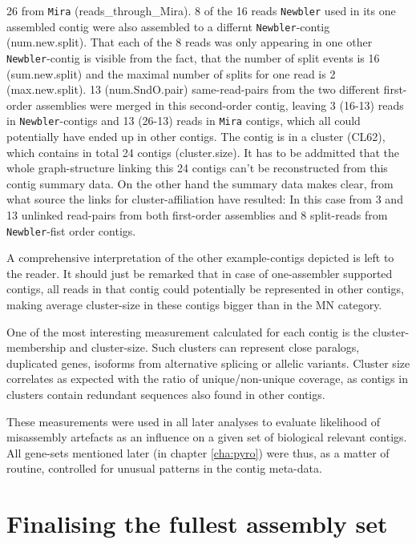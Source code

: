 26 from \texttt{Mira} (reads\_through\_Mira). 8 of the 16 reads
\texttt{Newbler} used in its one assembled contig were also assembled
to a differnt \texttt{Newbler}-contig (num.new.split). That each of
the 8 reads was only appearing in one other \texttt{Newbler}-contig is
visible from the fact, that the number of split events is 16
(sum.new.split) and the maximal number of splits for one read is 2
(max.new.split). 13 (num.SndO.pair) same-read-pairs from the two
different first-order assemblies were merged in this second-order
contig, leaving 3 (16-13) reads in \texttt{Newbler}-contigs and 13
(26-13) reads in \texttt{Mira} contigs, which all could potentially
have ended up in other contigs. The contig is in a cluster (CL62),
which contains in total 24 contigs (cluster.size). It has to be
addmitted that the whole graph-structure linking this 24 contigs can't
be reconstructed from this contig summary data. On the other hand the
summary data makes clear, from what source the links for
cluster-affiliation have resulted: In this case from 3 and 13 unlinked
read-pairs from both first-order assemblies and 8 split-reads from
\texttt{Newbler}-fist order contigs.

A comprehensive interpretation of the other example-contigs depicted
is left to the reader. It should just be remarked that in case of
one-assembler supported contigs, all reads in that contig could
potentially be represented in other contigs, making average
cluster-size in these contigs bigger than in the MN category.

One of the most interesting measurement calculated for each contig is
the cluster-membership and cluster-size. Such clusters can represent
close paralogs, duplicated genes, isoforms from alternative splicing
or allelic variants. Cluster size correlates as expected with the
ratio of unique/non-unique coverage, as contigs in clusters contain
redundant sequences also found in other contigs.

These measurements were used in all later analyses to evaluate
likelihood of misassembly artefacts as an influence on a given set of
biological relevant contigs. All gene-sets mentioned later (in chapter
\ref{cha:pyro}) were thus, as a matter of routine, controlled for
unusual patterns in the contig meta-data.

\section{Finalising the fullest assembly set}
\label{sec:final-full-assembly}

